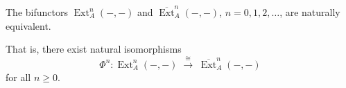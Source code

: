 The bifunctors $\operatorname{Ext}_A^n(-,-)$ and $\overline{\operatorname{Ext}}_A^n(-,-)$, $n = 0, 1, 2, \dots$, are naturally equivalent.

That is, there exist natural isomorphisms
$$
\Phi^n : \operatorname{Ext}_A^n(-,-) \;\xrightarrow{\;\cong\;}\; \overline{\operatorname{Ext}}_A^n(-,-)
$$
for all $n \geq 0$.
